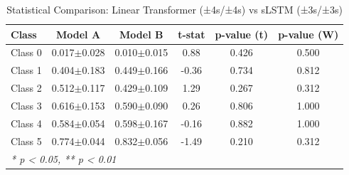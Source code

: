 \begin{table}[htbp]
\centering
\caption{Statistical Comparison: Linear Transformer (±4s/±4s) vs sLSTM (±3s/±3s)}
\label{tab:comparison_class_linear_transformer_±4s_±4s_vs_slstm_±3s_±3s}
\begin{tabular}{lccccc}
\toprule
\textbf{Class} & \textbf{Model A} & \textbf{Model B} & \textbf{t-stat} & \textbf{p-value (t)} & \textbf{p-value (W)} \\
\midrule
Class 0 & 0.017$\pm$0.028 & 0.010$\pm$0.015 & 0.88 & 0.426 & 0.500 \\
Class 1 & 0.404$\pm$0.183 & 0.449$\pm$0.166 & -0.36 & 0.734 & 0.812 \\
Class 2 & 0.512$\pm$0.117 & 0.429$\pm$0.109 & 1.29 & 0.267 & 0.312 \\
Class 3 & 0.616$\pm$0.153 & 0.590$\pm$0.090 & 0.26 & 0.806 & 1.000 \\
Class 4 & 0.584$\pm$0.054 & 0.598$\pm$0.167 & -0.16 & 0.882 & 1.000 \\
Class 5 & 0.774$\pm$0.044 & 0.832$\pm$0.056 & -1.49 & 0.210 & 0.312 \\
\bottomrule
\multicolumn{6}{l}{\textit{* p < 0.05, ** p < 0.01}} \\
\end{tabular}
\end{table}